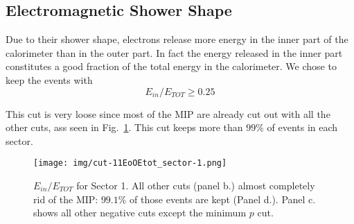 \clearpage\newpage


\subsection{Electromagnetic Shower Shape}
Due to their shower shape, electrons release more energy in 
the inner part of the calorimeter than in the outer part. In
fact the energy released in the inner part constitutes a good
fraction of the total energy in the calorimeter.
We chose to keep the events with $$E_{in}/E_{TOT} \geq 0.25$$

This cut is very loose since most of the MIP are already cut
out with all the other cuts, ass seen in Fig.~\ref{fig:einetot}.
This cut keeps more than $99\%$ of events in each sector.


\begin{figure}[ht]
  \centering
		\texttt{[image: img/cut-11EoOEtot\_sector-1.png]}
		\caption{$E_{in}/E_{TOT}$ for Sector 1. All other cuts (panel b.)
					almost completely rid of the MIP: $99.1\%$ of those events are kept (Panel d.). 
					Panel c. shows all other negative cuts except the minimum $p$ cut.}
 		\label{fig:einetot}
\end{figure}

